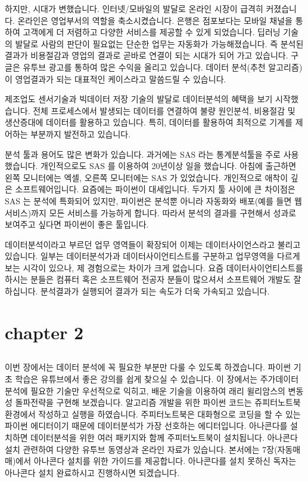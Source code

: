 \documentclass[letterpaper,10pt,english]{jupyterBook}
\begin{document}
\sphinxAtStartPar
하지만, 시대가 변했습니다. 인터넷/모바일의 발달로 온라인 시장이 급격히 커졌습니다. 온라인은 영업부서의 역할을 축소시켰습니다. 은행은 점포보다는 모바일 채널을 통하여 고객에게 더 저렴하고 다양한 서비스를 제공할 수 있게 되었습니다.  딥러닝 기술의 발달로 사람의 판단이 필요없는 단순한 업무는 자동화가 가능해졌습니다. 즉 분석된 결과가 비용절감과 영업의 결과로 곧바로 연결이 되는 시대가 되어 가고 있습니다. 구글은 유투브 광고를 통하여 많은 수익을 올리고 있습니다. 데이터 분석(추천 알고리즘) 이 영업결과가 되는 대표적인 케이스라고 말씀드릴 수 있습니다.

\sphinxAtStartPar
제조업도 센서기술과 빅데이터 저장 기술의 발달로 데이터분석의 혜택을 보기 시작했습니다. 전체 프로세스에서 발생되는 데이터를 연결하여 불량 원인분석, 비용절감 및 생산증대에 데이터를 활용하고 있습니다. 특히, 데이터를 활용하여 최적으로 기계를 제어하는 부분까지 발전하고 있습니다.

\sphinxAtStartPar
분석 툴과 용어도 많은 변화가 있습니다. 과거에는 SAS 라는 통계분석툴을 주로 사용했습니다. 개인적으로도 SAS 를 이용하여 20년이상 일을 했습니다. 아침에 출근하면 왼쪽 모니터에는 엑셀, 오른쪽 모니터에는 SAS 가 있었습니다. 개인적으로 애착이 깊은 소프트웨어입니다. 요즘에는 파이썬이 대세입니다. 두가지 툴 사이에 큰 차이점은 SAS 는 분석에 특화되어 있지만, 파이썬은 분석뿐 아니라 자동화와 배포(예를 들면 웹서비스)까지 모든 서비스를 가능하게 합니다. 따라서 분석의 결과를 구현해서 성과로 보여주고 싶다면 파이썬이 좋은 툴입니다.

\sphinxAtStartPar
데이터분석이라고 부르던 업무 영역들이 확장되어 이제는 데이터사이언스라고 불리고 있습니다. 일부는 데이터분석가과 데이터사이언티스트를 구분하고 업무영역을 다르게 보는 시각이 있으나, 제 경험으로는 차이가 크게 없습니다. 요즘 데이터사이언티스트를 하시는 분들은 컴퓨터 혹은 소프트웨어 전공자 분들이 많으셔서 소프트웨어 개발도 잘 하십니다. 분석결과가 실행되어 결과가 되는 속도가 더욱 가속되고 있습니다.


\part{chapter 2}


\chapter{}
\label{\detokenize{chapter2/2.1.0_Python_Basics:id1}}\label{\detokenize{chapter2/2.1.0_Python_Basics::doc}}
\sphinxAtStartPar
이번 장에서는 데이터 분석에 꼭 필요한 부분만 다룰 수 있도록 하겠습니다. 파이썬 기초 학습은 유튜브에서 좋은 강의를 쉽게 찾으실 수 있습니다. 이 장에서는 주가데이터 분석에 필요한 기술만 우선적으로 익히고, 배운 기술을 이용하여 래리 윌리암스의 변동성 돌파전략을 구현해 보겠습니다. 알고리즘 개발을 위한 파이썬 코드는 쥬피터노트북 환경에서 작성하고 실행을 하였습니다. 주피터노트북은 대화형으로 코딩을 할 수 있는 파이썬 에디터이기 때문에 데이터분석가 가장 선호하는 에디터입니다. 아나콘다를 설치하면 데이터분석을 위한 여러 패키지와 함께 주피터노트북이 설치됩니다. 아나콘다 설치 관련하여 다양한 유투브 동영상과 온라인 자료가 있습니다. 본서에는 7장(자동매매)에서 아나콘다 설치를 위한 가이드를 제공합니다. 아나콘다를 설치 못하신 독자는 아나콘다 설치 완료하시고 진행하시면 되겠습니다.
\end{document}
